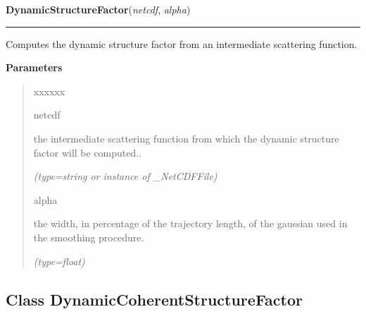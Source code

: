     \vspace{0.5ex}

\hspace{.8\funcindent}\begin{boxedminipage}{\funcwidth}

    \raggedright \textbf{DynamicStructureFactor}(\textit{netcdf}, \textit{alpha})

    \vspace{-1.5ex}

    \rule{\textwidth}{0.5\fboxrule}
\setlength{\parskip}{2ex}
    Computes the dynamic structure factor from an intermediate scattering 
    function.

\setlength{\parskip}{1ex}
      \textbf{Parameters}
      \vspace{-1ex}

      \begin{quote}
        \begin{Ventry}{xxxxxx}

          \item[netcdf]

          the intermediate scattering function from which the dynamic 
          structure factor will be computed..

            {\it (type=string or instance of \_NetCDFFile)}

          \item[alpha]

          the width, in percentage of the trajectory length, of the 
          gaussian used in the smoothing procedure.

            {\it (type=float)}

        \end{Ventry}

      \end{quote}

    \end{boxedminipage}



\subsection{Class DynamicCoherentStructureFactor}


